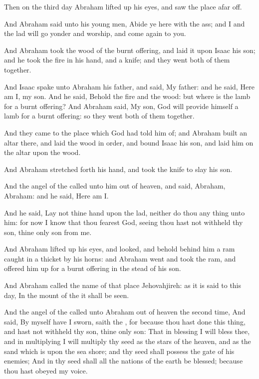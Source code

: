 \Verse Then on the third day Abraham lifted up his eyes, and saw the place afar off.

\Verse And Abraham said unto his young men, Abide ye here with the ass; and I and the lad will go yonder and worship, and come again to you.

\Verse And Abraham took the wood of the burnt offering, and laid it upon Isaac his son; and he took the fire in his hand, and a knife; and they went both of them together.

\Verse And Isaac spake unto Abraham his father, and said, My father: and he said, Here am I, my son. And he said, Behold the fire and the wood: but where is the lamb for a burnt offering?  \Verse And Abraham said, My son, God will provide himself a lamb for a burnt offering: so they went both of them together.

\Verse And they came to the place which God had told him of; and Abraham built an altar there, and laid the wood in order, and bound Isaac his son, and laid him on the altar upon the wood.

\Verse And Abraham stretched forth his hand, and took the knife to slay his son.

\Verse And the angel of the \LORD called unto him out of heaven, and said, Abraham, Abraham: and he said, Here am I.

\Verse And he said, Lay not thine hand upon the lad, neither do thou any thing unto him: for now I know that thou fearest God, seeing thou hast not withheld thy son, thine only son from me.

\Verse And Abraham lifted up his eyes, and looked, and behold behind him a ram caught in a thicket by his horns: and Abraham went and took the ram, and offered him up for a burnt offering in the stead of his son.

\Verse And Abraham called the name of that place Jehovahjireh: as it is said to this day, In the mount of the \LORD it shall be seen.

\Verse And the angel of the \LORD called unto Abraham out of heaven the second time, \Verse And said, By myself have I sworn, saith the \LORD, for because thou hast done this thing, and hast not withheld thy son, thine only son: \Verse That in blessing I will bless thee, and in multiplying I will multiply thy seed as the stars of the heaven, and as the sand which is upon the sea shore; and thy seed shall possess the gate of his enemies; \Verse And in thy seed shall all the nations of the earth be blessed; because thou hast obeyed my voice.

